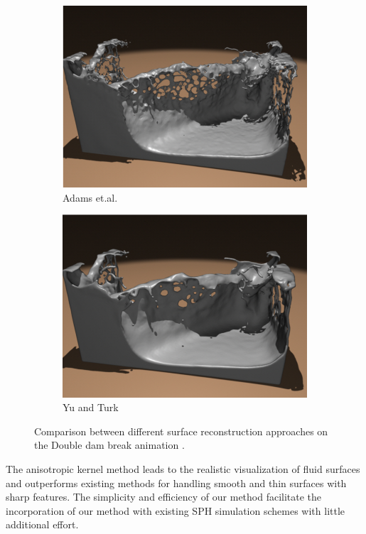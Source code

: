 \begin{figure}[H]
	\begin{center}
		\begin{subfigure}[b]{0.48\textwidth}
			\includegraphics[width=\textwidth]{figures/Adams.et.al.Reconstruction.png}
			\caption{Adams et.al.}
		\end{subfigure}
		\begin{subfigure}[b]{0.48\textwidth}
			\includegraphics[width=\textwidth]{figures/Ya_and_Turl.Reconstruction.png}
			\caption{Yu and Turk}
		\end{subfigure}
	\end{center}
	\caption{Comparison between different surface reconstruction approaches on the Double dam break animation \cite{YuTurk}.}
	\label{fig:Adams_vs_YoTurk}
\end{figure}
The anisotropic kernel method leads to the realistic visualization of fluid surfaces and outperforms existing methods for handling smooth and thin surfaces with sharp features. The simplicity and efficiency of our method facilitate the incorporation of our method with existing SPH simulation schemes with little additional effort.